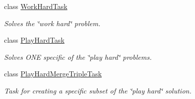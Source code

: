 \begin{DoxyCompactItemize}
class \hyperlink{classoma_1_1_work_hard_task}{Work\-Hard\-Task}
\begin{DoxyCompactList}\small\item\em Solves the \char`\"{}work hard\char`\"{} problem. \end{DoxyCompactList}\item 
class \hyperlink{classoma_1_1_play_hard_task}{Play\-Hard\-Task}
\begin{DoxyCompactList}\small\item\em Solves O\-N\-E specific of the \char`\"{}play hard\char`\"{} problems. \end{DoxyCompactList}\item 
class \hyperlink{classoma_1_1_play_hard_merge_triple_task}{Play\-Hard\-Merge\-Triple\-Task}
\begin{DoxyCompactList}\small\item\em Task for creating a specific subset of the \char`\"{}play hard\char`\"{} solution. \end{DoxyCompactList}\end{DoxyCompactItemize}
